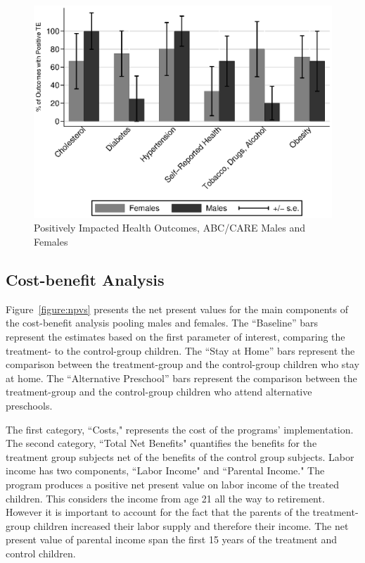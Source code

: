 \begin{figure}[H]
		\caption{Positively Impacted Health Outcomes, ABC/CARE Males and Females} \label{fig:ppositivecategory2}
		\includegraphics[width=.78\columnwidth]{output/itt_noctrl_cats2.eps}
\end{figure}

\subsection{Cost-benefit Analysis} \label{section:cbaresults}

Figure~\ref{figure:npvs} presents the net present values for the main components of the cost-benefit analysis pooling males and females. The ``Baseline'' bars represent the estimates based on the first parameter of interest, comparing the treatment- to the control-group children. The ``Stay at Home'' bars represent the comparison between the treatment-group and the control-group children who stay at home. The ``Alternative Preschool'' bars represent the comparison between the treatment-group and the control-group children who attend alternative preschools.

The first category, ``Costs," represents the cost of the programs' implementation. The second category, ``Total Net Benefits" quantifies the benefits for the treatment group subjects net of the benefits of the control group subjects. Labor income has two components, ``Labor Income" and ``Parental Income." The program produces a positive net present value on labor income of the treated children. This considers the income from age 21 all the way to retirement. However it is important to account for the fact that the parents of the treatment-group children increased their labor supply and therefore their income. The net present value of parental income span the first 15 years of the treatment and control children.

